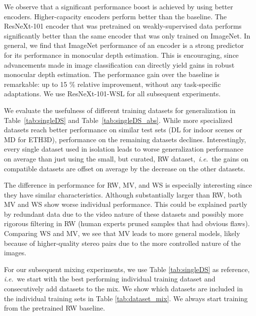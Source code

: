 We observe that a significant performance boost is achieved by using better encoders. Higher-capacity encoders perform better than the baseline. The {ResNeXt-101} encoder that was pretrained on weakly-supervised data performs significantly better than the same encoder that was only trained on ImageNet.  In general, we find that ImageNet performance of an encoder is a strong predictor for its performance in monocular depth estimation. This is encouraging, since advancements made in image classification can directly yield gains in robust monocular depth estimation. The performance gain over the baseline is remarkable: up to 15 \% relative improvement, without any task-specific adaptations. We use {ResNeXt-101-WSL} for all subsequent experiments.

 We evaluate the usefulness of different training datasets for generalization in Table~\ref{tab:singleDS} and Table~\ref{tab:singleDS_abs}. While more specialized datasets reach better performance on similar test sets (DL for indoor scenes or MD for ETH3D), performance on the remaining datasets declines. Interestingly, every single dataset used in isolation leads to worse generalization performance on average than just using the small, but curated, RW dataset,~\MakeLowercase{\textit{i.e.}}\ the gains on compatible datasets are offset on average by the decrease on the other datasets.

The difference in performance for RW, MV, and WS is especially interesting since they have similar characteristics. Although substantially larger than RW, both MV and WS show worse individual performance. This could be explained partly by redundant data due to the video nature of these datasets and possibly more rigorous filtering in RW (human experts pruned samples that had obvious flaws). Comparing WS and MV, we see that MV leads to more general models, likely because of higher-quality stereo pairs due to the more controlled nature of the images.

For our subsequent mixing experiments, we use Table \ref{tab:singleDS} as reference, \MakeLowercase{\textit{i.e.}}\ we start with the best performing individual training dataset and consecutively add datasets to the mix. We show which datasets are included in the individual training sets in Table \ref{tab:dataset_mix}.  We always start training from the pretrained RW baseline.

